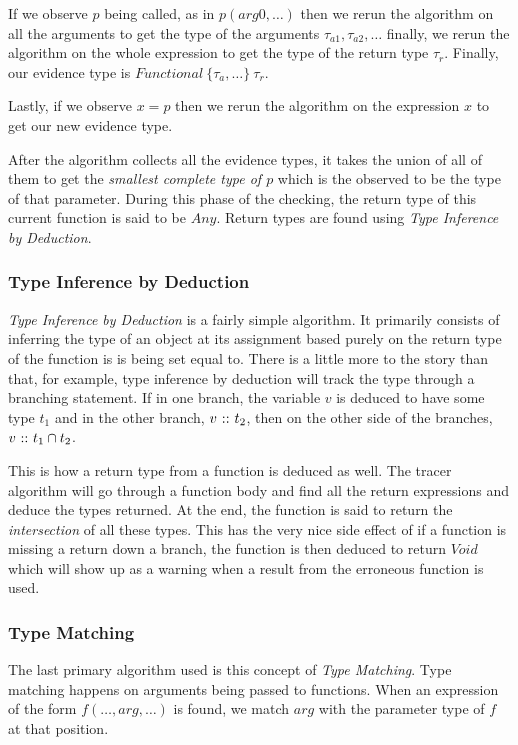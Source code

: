 \documentclass{scrartcl}
\begin{document}
\begin{multicols}{2}
If we observe $p$ being called, as in $p(arg0,\ldots)$ then we rerun
the algorithm on all the arguments to get the type of the arguments
$\tau_{a1}, \tau_{a2}, \ldots$ finally, we rerun the algorithm on
the whole expression to get the type of the return type $\tau_r$.
Finally, our evidence type is $Functional\ \{\tau_a,\ldots\}\ \tau_r$.

Lastly, if we observe $x = p$ then we rerun the algorithm on the expression
$x$ to get our new evidence type.

After the algorithm collects all the evidence types, it takes the union
of all of them to get the \emph{smallest complete type of $p$} which is
the observed to be the type of that parameter. During this phase of
the checking, the return type of this current function is said to be $Any$.
Return types are found using \emph{Type Inference by Deduction}.

\subsubsection*{Type Inference by Deduction}

\emph{Type Inference by Deduction} is a fairly simple algorithm. It primarily
consists of inferring the type of an object at its assignment based purely
on the return type of the function is is being set equal to. There is a little
more to the story than that, for example, type inference by deduction will
track the type through a branching statement. If in one branch, the variable
$v$ is deduced to have some type $t_1$ and in the other branch, $v{\ ::\ } t_2$,
then on the other side of the branches, $v{\ ::\ } t_1\cap t_2$.

This is how a return type from a function is deduced as well. The tracer algorithm
will go through a function body and find all the return expressions and
deduce the types returned. At the end, the function is said to return the
\emph{intersection} of all these types. This has the very nice side effect
of if a function is missing a return down a branch, the function is then
deduced to return $Void$ which will show up as a warning when a result
from the erroneous function is used.

\subsubsection*{Type Matching}

The last primary algorithm used is this concept of \emph{Type Matching}.
Type matching happens on arguments being passed to functions. When
an expression of the form $f(\ldots, arg, \ldots)$ is found, we match
$arg$ with the parameter type of $f$ at that position.


\end{multicols}
\end{document}
